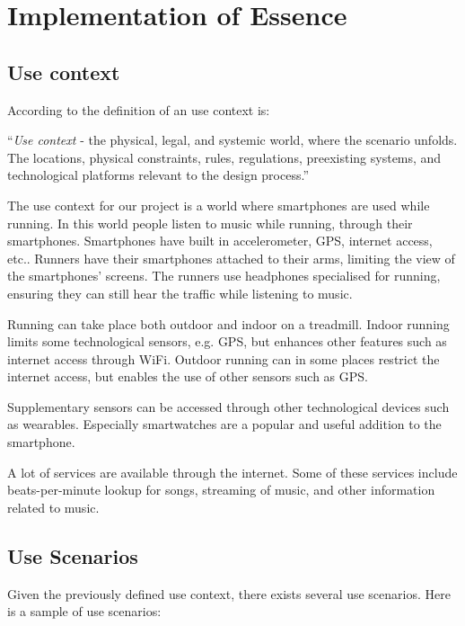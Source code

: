 \section{Implementation of Essence}


\subsection{Use context}
According to \cite[ p. 83]{essence} the definition of an use context is:

\begin{center}
	“\textit{Use context} - the physical, legal, and systemic world, where the scenario unfolds.
	 The locations, physical constraints, rules, regulations, preexisting systems, and technological platforms relevant to the design process.”
\end{center}

The use context for our project is a world where smartphones are used while running.
In this world people listen to music while running, through their smartphones.
Smartphones have built in accelerometer, GPS, internet access, etc..
Runners have their smartphones attached to their arms, limiting the view of the smartphones' screens.
The runners use headphones specialised for running, ensuring they can still hear the traffic while listening to music.

Running can take place both outdoor and indoor on a treadmill.
Indoor running limits some technological sensors, e.g. GPS, but enhances other features such as internet access through WiFi.
Outdoor running can in some places restrict the internet access, but enables the use of other sensors such as GPS.

Supplementary sensors can be accessed through other technological devices such as wearables.
Especially smartwatches are a popular and useful addition to the smartphone.

A lot of services are available through the internet.
Some of these services include beats-per-minute lookup for songs, streaming of music, and other information related to music.


\subsection{Use Scenarios}
Given the previously defined use context, there exists several use scenarios.
Here is a sample of use scenarios:


